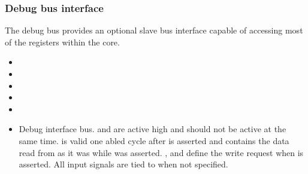 
\subsubsection{Debug bus interface}
\label{sec:core-ug-cfg-inst-port-debug}

The debug bus provides an optional slave bus interface capable of accessing most of the registers within the core.

\begin{itemize}
  
\item {}
\item {}
\item {}
\item {}
\item {}
\item {}

Debug interface bus.  and  are 
active high and should not be active at the same time.  is 
valid one abled cycle after  is asserted and 
contains the data read from  as it was while 
 was asserted. , 
 and  define the write request when 
 is asserted. All input signals are tied to  
when not specified.

\end{itemize}

